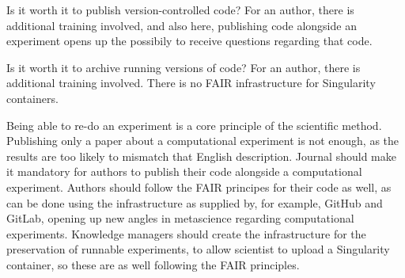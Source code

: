 Is it worth it to publish version-controlled code?
For an author, 
there is additional training involved, and also here,
publishing code alongside an experiment opens up
the possibily to receive questions regarding that code.


Is it worth it to archive running versions of code?
For an author, 
there is additional training involved.
There is no FAIR infrastructure for Singularity containers.



Being able to re-do an experiment is a core principle of the scientific method.
Publishing only a paper about a computational experiment is not enough,
as the results are too likely to mismatch that English description.
Journal should make it mandatory for authors
to publish their code alongside a computational experiment.
Authors should follow the FAIR principes for their code as well,
as can be done using the infrastructure as supplied by, 
for example, GitHub and GitLab, opening up new angles in
metascience regarding computational experiments.
Knowledge managers should create the infrastructure for the preservation
of runnable experiments, to allow scientist to upload a Singularity
container, so these are as well following the FAIR principles.

